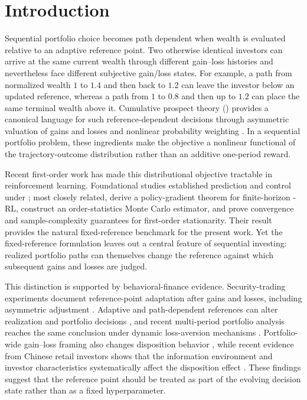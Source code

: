 \section{Introduction}\label{sec:introduction}

Sequential portfolio choice becomes path dependent when wealth is evaluated relative to an adaptive reference point.  Two otherwise identical investors can arrive at the same current wealth through different gain--loss histories and nevertheless face different subjective gain/loss states.  For example, a path from normalized wealth $1$ to $1.4$ and then back to $1.2$ can leave the investor below an updated reference, whereas a path from $1$ to $0.8$ and then up to $1.2$ can place the same terminal wealth above it.  Cumulative prospect theory (\CPT) provides a canonical language for such reference-dependent decisions through asymmetric valuation of gains and losses and nonlinear probability weighting \citep{kahneman1979prospect,tversky1992advances}.  In a sequential portfolio problem, these ingredients make the objective a nonlinear functional of the trajectory-outcome distribution rather than an additive one-period reward.

Recent first-order work has made this distributional objective tractable in reinforcement learning.  Foundational studies established prediction and control under \CPT \citep{prashanth2016cumulative}; most closely related, \citet{lepel2026policygradients} derive a policy-gradient theorem for finite-horizon \CPT-RL, construct an order-statistics Monte Carlo estimator, and prove convergence and sample-complexity guarantees for first-order stationarity.  Their result provides the natural fixed-reference benchmark for the present work.  Yet the fixed-reference formulation leaves out a central feature of sequential investing: realized portfolio paths can themselves change the reference against which subsequent gains and losses are judged.

This distinction is supported by behavioral-finance evidence.  Security-trading experiments document reference-point adaptation after gains and losses, including asymmetric adjustment \citep{arkes2008reference}.  Adaptive and path-dependent references can alter realization and portfolio decisions \citep{he2019realization,qin2022realization}, and recent multi-period portfolio analysis reaches the same conclusion under dynamic loss-aversion mechanisms \citep{gao2024multiperiod}.  Portfolio-wide gain--loss framing also changes disposition behavior \citep{an2024portfolio}, while recent evidence from Chinese retail investors shows that the information environment and investor characteristics systematically affect the disposition effect \citep{chen2025xueqiu}.  These findings suggest that the reference point should be treated as part of the evolving decision state rather than as a fixed hyperparameter.

